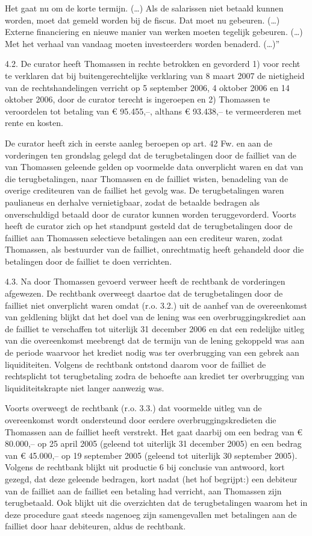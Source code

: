 \documentclass[
  dutch,
  a4paper,
]{article}
\begin{document}
Het gaat nu om de korte termijn. (\ldots) Als de salarissen niet betaald kunnen worden, moet dat gemeld worden bij de fiscus. Dat moet nu gebeuren. (\ldots) Externe financiering en nieuwe manier van werken moeten tegelijk gebeuren. (\ldots) Met het verhaal van vandaag moeten investeerders worden benaderd. (\ldots)''

4.2. De curator heeft Thomassen in rechte betrokken en gevorderd 1) voor recht te verklaren dat bij buitengerechtelijke verklaring van 8 maart 2007 de nietigheid van de rechtshandelingen verricht op 5 september 2006, 4 oktober 2006 en 14 oktober 2006, door de curator terecht is ingeroepen en 2) Thomassen te veroordelen tot betaling van € 95.455,--, althans € 93.438,-- te vermeerderen met rente en kosten.

De curator heeft zich in eerste aanleg beroepen op art. 42 Fw. en aan de vorderingen ten grondslag gelegd dat de terugbetalingen door de failliet van de van Thomassen geleende gelden op voormelde data onverplicht waren en dat van die terugbetalingen, naar Thomassen en de failliet wisten, benadeling van de overige crediteuren van de failliet het gevolg was. De terugbetalingen waren paulianeus en derhalve vernietigbaar, zodat de betaalde bedragen als onverschuldigd betaald door de curator kunnen worden teruggevorderd. Voorts heeft de curator zich op het standpunt gesteld dat de terugbetalingen door de failliet aan Thomassen selectieve betalingen aan een crediteur waren, zodat Thomassen, als bestuurder van de failliet, onrechtmatig heeft gehandeld door die betalingen door de failliet te doen verrichten.

4.3. Na door Thomassen gevoerd verweer heeft de rechtbank de vorderingen afgewezen. De rechtbank overweegt daartoe dat de terugbetalingen door de failliet niet onverplicht waren omdat (r.o. 3.2.) uit de aanhef van de overeenkomst van geldlening blijkt dat het doel van de lening was een overbruggingskrediet aan de failliet te verschaffen tot uiterlijk 31 december 2006 en dat een redelijke uitleg van die overeenkomst meebrengt dat de termijn van de lening gekoppeld was aan de periode waarvoor het krediet nodig was ter overbrugging van een gebrek aan liquiditeiten. Volgens de rechtbank ontstond daarom voor de failliet de rechtsplicht tot terugbetaling zodra de behoefte aan krediet ter overbrugging van liquiditeitskrapte niet langer aanwezig was.

Voorts overweegt de rechtbank (r.o. 3.3.) dat voormelde uitleg van de overeenkomst wordt ondersteund door eerdere overbruggingskredieten die Thomassen aan de failliet heeft verstrekt. Het gaat daarbij om een bedrag van € 80.000,-- op 25 april 2005 (geleend tot uiterlijk 31 december 2005) en een bedrag van € 45.000,-- op 19 september 2005 (geleend tot uiterlijk 30 september 2005). Volgens de rechtbank blijkt uit productie 6 bij conclusie van antwoord, kort gezegd, dat deze geleende bedragen, kort nadat (het hof begrijpt:) een debiteur van de failliet aan de failliet een betaling had verricht, aan Thomassen zijn terugbetaald. Ook blijkt uit die overzichten dat de terugbetalingen waarom het in deze procedure gaat steeds nagenoeg zijn samengevallen met betalingen aan de failliet door haar debiteuren, aldus de rechtbank.
\end{document}
